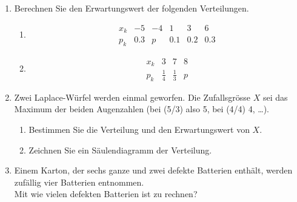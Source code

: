 \begin{ueb}
    {}{}
    \begin{enumerate}
        \item Berechnen Sie den Erwartungswert der folgenden Verteilungen.
              \begin{enumerate}
                  \item
                        \[
                            \begin{array}{c|ccccc}
                                x_k & -5  & -4 & 1   & 3   & 6   \\ \hline
                                p_k & 0.3 & p  & 0.1 & 0.2 & 0.3
                            \end{array}
                        \]
                  \item
                        \[
                            \begin{array}{c|ccc}
                                x_k & 3           & 7           & 8 \\ \hline
                                p_k & \frac{1}{4} & \frac{1}{3} & p
                            \end{array}
                        \]
              \end{enumerate}

        \item Zwei Laplace-Würfel werden einmal geworfen. Die Zufallsgrösse \( X \) sei das Maximum der beiden Augenzahlen (bei (5/3) also 5, bei (4/4) 4, \ldots).
              \begin{enumerate}
                  \item Bestimmen Sie die Verteilung und den Erwartungswert von \( X \).
                  \item Zeichnen Sie ein Säulendiagramm der Verteilung.
              \end{enumerate}


        \item Einem Karton, der sechs ganze und zwei defekte Batterien enthält, werden zufällig vier Batterien entnommen. \\
              Mit wie vielen defekten Batterien ist zu rechnen?



\end{enumerate}
\end{ueb}
